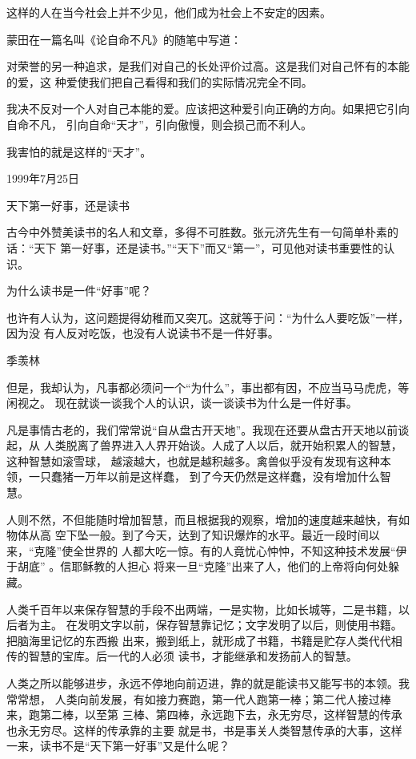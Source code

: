 \documentclass[11pt]{ctexart}
\begin{document}
{{{{这样的人在当今社会上并不少见，他们成为社会上不安定的因素。

蒙田在一篇名叫《论自命不凡》的随笔中写道：

对荣誉的另一种追求，是我们对自己的长处评价过高。这是我们对自己怀有的本能的爱，这
种爱使我们把自己看得和我们的实际情况完全不同。

我决不反对一个人对自己本能的爱。应该把这种爱引向正确的方向。如果把它引向自命不凡，
引向自命“天才”，引向傲慢，则会损己而不利人。

我害怕的就是这样的“天才”。

1999年7月25日

天下第一好事，还是读书

古今中外赞美读书的名人和文章，多得不可胜数。张元济先生有一句简单朴素的话：“天下
第一好事，还是读书。”“天下”而又“第一”，可见他对读书重要性的认识。

为什么读书是一件“好事”呢？

也许有人认为，这问题提得幼稚而又突兀。这就等于问：“为什么人要吃饭”一样，因为没
有人反对吃饭，也没有人说读书不是一件好事。



季羡林

但是，我却认为，凡事都必须问一个“为什么”，事出都有因，不应当马马虎虎，等闲视之。
现在就谈一谈我个人的认识，谈一谈读书为什么是一件好事。

凡是事情古老的，我们常常说“自从盘古开天地”。我现在还要从盘古开天地以前谈起，从
人类脱离了兽界进入人界开始谈。人成了人以后，就开始积累人的智慧，这种智慧如滚雪球，
越滚越大，也就是越积越多。禽兽似乎没有发现有这种本领，一只蠢猪一万年以前是这样蠢，
到了今天仍然是这样蠢，没有增加什么智慧。

人则不然，不但能随时增加智慧，而且根据我的观察，增加的速度越来越快，有如物体从高
空下坠一般。到了今天，达到了知识爆炸的水平。最近一段时间以来，“克隆”使全世界的
人都大吃一惊。有的人竟忧心忡忡，不知这种技术发展“伊于胡底” 。信耶稣教的人担心
将来一旦“克隆”出来了人，他们的上帝将向何处躲藏。

人类千百年以来保存智慧的手段不出两端，一是实物，比如长城等，二是书籍，以后者为主。
在发明文字以前，保存智慧靠记忆；文字发明了以后，则使用书籍。把脑海里记忆的东西搬
出来，搬到纸上，就形成了书籍，书籍是贮存人类代代相传的智慧的宝库。后一代的人必须
读书，才能继承和发扬前人的智慧。

人类之所以能够进步，永远不停地向前迈进，靠的就是能读书又能写书的本领。我常常想，
人类向前发展，有如接力赛跑，第一代人跑第一棒；第二代人接过棒来，跑第二棒，以至第
三棒、第四棒，永远跑下去，永无穷尽，这样智慧的传承也永无穷尽。这样的传承靠的主要
就是书，书是事关人类智慧传承的大事，这样一来，读书不是“天下第一好事”又是什么呢？





}}}}
\end{document}
